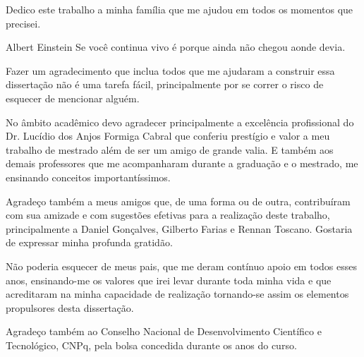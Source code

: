 \documentclass[oneside,normaltoc,espacoduplo,PGTEXdissertacao]{pgeeltex}
\begin{document}


\folhaderostoPGTEX
\folhadeaprovacaoPGTEX

\doublespacing
%
\begin{dedicatoriaPGTEX}
Dedico este trabalho a minha família que me ajudou em todos os momentos
que precisei.
\end{dedicatoriaPGTEX}


  

\begin{epigrafePGTEX}{Albert Einstein} 
Se você continua vivo é porque ainda não chegou aonde devia.
\end{epigrafePGTEX}


\begin{agradecimentosPGTEX} 
Fazer um agradecimento que inclua todos que me ajudaram a construir
essa dissertação não é uma tarefa fácil, principalmente por se correr
o risco de esquecer de mencionar alguém.

No âmbito acadêmico devo agradecer principalmente a excelência profissional do
Dr. Lucídio dos Anjos Formiga Cabral que conferiu prestígio e valor a meu
trabalho de mestrado além de ser um amigo de grande valia. E também aos demais
professores que me acompanharam durante a graduação e o mestrado, me ensinando
conceitos importantíssimos.

Agradeço também a meus amigos que, de uma forma ou de outra,
contribuíram com sua amizade e com sugestões efetivas para a realização deste
trabalho, principalmente a Daniel Gonçalves, Gilberto Farias e Rennan Toscano. 
Gostaria de expressar minha profunda gratidão.

Não poderia esquecer de meus pais, que me deram contínuo apoio em todos esses
anos, ensinando-me os valores que irei levar durante toda minha vida e que
acreditaram na minha capacidade de realização tornando-se assim os elementos
propulsores desta dissertação. 

Agradeço também ao Conselho Nacional de Desenvolvimento Científico e
Tecnológico, CNPq, pela bolsa concedida durante os anos do curso.

\end{agradecimentosPGTEX}
\end{document}
